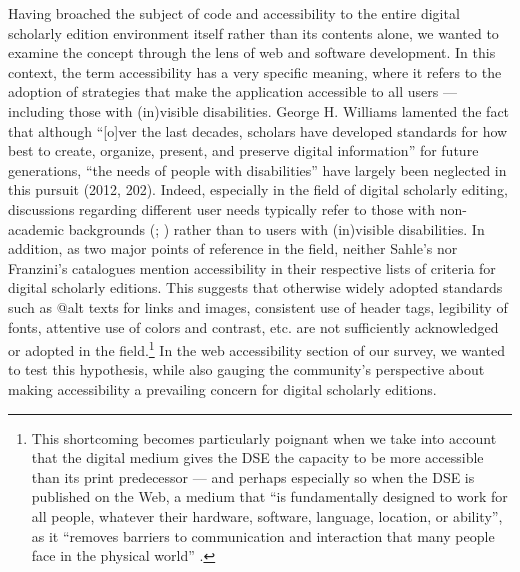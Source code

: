 \begin{paper}
Having broached the subject of code and accessibility to the entire
digital scholarly edition environment itself rather than its contents
alone, we wanted to examine the concept through the lens of web and
software development. In this context, the term accessibility has a very
specific meaning, where it refers to the adoption of strategies that
make the application accessible to all users --- including those with
(in)visible disabilities. George H. Williams lamented the fact that
although ``{[}o{]}ver the last decades, scholars have developed
standards for how best to create, organize, present, and preserve
digital information'' for future generations, ``the needs of people with
disabilities'' have largely been neglected in this pursuit (2012, 202).
Indeed, especially in the field of digital scholarly editing,
discussions regarding different user needs typically refer to those with
non-academic backgrounds (\citealt[93]{apollon_digital_2014}; \citealt[151]{pierazzo_digital_2015})
rather than to users with (in)visible disabilities. In addition, as two
major points of reference in the field, neither Sahle's \citeyearpar{sahle_what_2016} nor
Franzini's \citeyearpar{franzini_catalogue_2016} catalogues mention accessibility in their respective
lists of criteria for digital scholarly editions. This suggests that
otherwise widely adopted standards such as @alt texts for links and
images, consistent use of header tags, legibility of fonts, attentive
use of colors and contrast, etc. are not sufficiently acknowledged or
adopted in the field.\footnote{This shortcoming becomes particularly
  poignant when we take into account that the digital medium gives the
  DSE the capacity to be more accessible than its print predecessor ---
  and perhaps especially so when the DSE is published on the Web, a
  medium that ``is fundamentally designed to work for all people,
  whatever their hardware, software, language, location, or ability'',
  as it ``removes barriers to communication and interaction that many
  people face in the physical world'' \citep{w3c_accessibility_2018}.} In the web
accessibility section of our survey, we wanted to test this hypothesis,
while also gauging the community's perspective about making
accessibility a prevailing concern for digital scholarly editions.


\end{paper}
